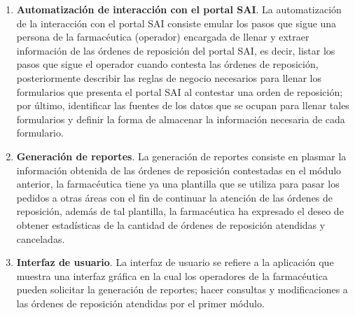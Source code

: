 \documentclass[a4paper,10pt]{article}
\begin{document}
\begin{enumerate}
\item \textbf{Automatización de interacción con el portal SAI}. La automatización de la interacción con el portal SAI consiste emular los pasos que sigue una persona de la farmacéutica (operador) encargada de llenar y extraer información de las órdenes de reposición del portal SAI, es decir, listar los pasos que sigue el operador cuando contesta las órdenes de reposición, posteriormente describir las reglas de negocio necesarios para llenar los formularios que presenta el portal SAI al contestar una orden de reposición; por último, identificar las fuentes de los datos que se ocupan para llenar tales formularios y definir la forma de almacenar la información necesaria de cada formulario.
\item \textbf{Generación de reportes}. La generación de reportes consiste en plasmar la información obtenida de las órdenes de reposición contestadas en el módulo anterior, la farmacéutica tiene ya una plantilla que se utiliza para pasar los pedidos a otras áreas con el fin de continuar la atención de las órdenes de reposición, además de tal plantilla, la farmacéutica ha expresado el deseo de obtener estadísticas de la cantidad de órdenes de reposición atendidas y canceladas.
\item \textbf{Interfaz de usuario}. La interfaz de usuario se refiere a la aplicación que muestra una interfaz gráfica en la cual los operadores de la farmacéutica pueden solicitar la generación de reportes; hacer consultas y modificaciones a las órdenes de reposición atendidas por el primer módulo.
\end{enumerate}
\end{document}
